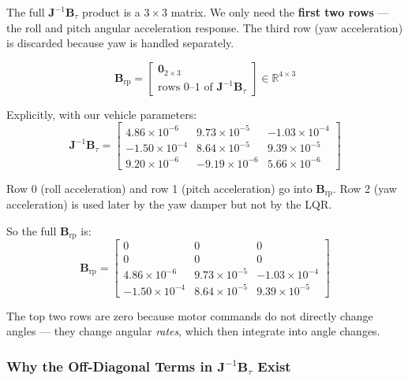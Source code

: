\documentclass[12pt, a4paper]{article}
\newcommand{\R}{\mathbb{R}}
\newcommand{\bJ}{\bm{J}}
\newcommand{\bB}{\bm{B}}
\newcommand{\bzero}{\bm{0}}
\begin{document}
The full $\bJ^{-1} \bB_\tau$ product is a $3 \times 3$ matrix.  We only need the \textbf{first two rows} --- the roll and pitch angular acceleration response.  The third row (yaw acceleration) is discarded because yaw is handled separately.

\begin{equation}
    \bB_{\text{rp}} = \begin{bmatrix}
        \bzero_{2\times3} \\
        \text{rows 0--1 of } \bJ^{-1} \bB_\tau
    \end{bmatrix}
    \in \R^{4 \times 3}
\end{equation}

Explicitly, with our vehicle parameters:
\begin{equation}
    \bJ^{-1} \bB_\tau = \begin{bmatrix}
        4.86 \times 10^{-6} & 9.73 \times 10^{-5} & -1.03 \times 10^{-4} \\
        -1.50 \times 10^{-4} & 8.64 \times 10^{-5} & 9.39 \times 10^{-5} \\
        9.20 \times 10^{-6} & -9.19 \times 10^{-6} & 5.66 \times 10^{-6}
    \end{bmatrix}
\end{equation}

Row 0 (roll acceleration) and row 1 (pitch acceleration) go into $\bB_{\text{rp}}$.  Row 2 (yaw acceleration) is used later by the yaw damper but not by the LQR.

So the full $\bB_{\text{rp}}$ is:
\begin{equation}
    \bB_{\text{rp}} = \begin{bmatrix}
        0 & 0 & 0 \\
        0 & 0 & 0 \\
        4.86 \times 10^{-6} & 9.73 \times 10^{-5} & -1.03 \times 10^{-4} \\
        -1.50 \times 10^{-4} & 8.64 \times 10^{-5} & 9.39 \times 10^{-5}
    \end{bmatrix}
\end{equation}

The top two rows are zero because motor commands do not directly change angles --- they change angular \emph{rates}, which then integrate into angle changes.

\subsubsection{Why the Off-Diagonal Terms in $\bJ^{-1} \bB_\tau$ Exist}
\end{document}
